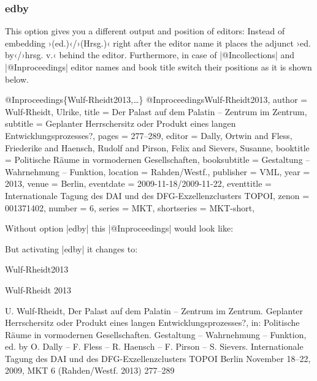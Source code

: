 \documentclass[a4paper,
10pt,
greek,
french,
spanish,
italian,
ngerman,
english
]{ltxdoc}
\begin{document}
\subsubsection{edby}\label{edby}
This option gives you a different output and position of editors: 
Instead of embedding ›(ed.)‹/›(Hrsg.)‹ right after the editor name
 it places the adjunct ›ed. by‹/›hrsg. v.‹ behind the editor. 
 Furthermore, in case of |@Incollections| and |@Inproceedings| editor names and book title switch their positions as it is shown below.

\begin{bibexample}[label=Wulf-Rheidt2013]{{@}Inproceedings\{Wulf-Rheidt2013,…\}}
@Inproceedings{Wulf-Rheidt2013,
  author       = {Wulf-Rheidt, Ulrike},
  title        = {Der Palast auf dem Palatin -- Zentrum im Zentrum},
  subtitle     = {Geplanter Herrschersitz oder Produkt eines langen Entwicklungsprozesses?},
  pages        = {277--289},
  editor       = {Dally, Ortwin and Fless, Friederike and Haensch, Rudolf and Pirson, Felix and Sievers, Susanne},
  booktitle    = {Politische Räume in vormodernen Gesellschaften},
  booksubtitle = {Gestaltung – Wahrnehmung – Funktion},
  location     = {Rahden/Westf\adddot},
  publisher    = VML,    %
  year         = {2013},
  venue        = Berlin,   %
  eventdate    = {2009-11-18/2009-11-22},
  eventtitle   = {Internationale Tagung des DAI und des DFG-Exzellenzclusters TOPOI},
  zenon       = {001371402},
  number       = {6},
  series       = MKT,    %
  shortseries  = MKT-short,  %
}
\end{bibexample}

Without option |edby| this |@Inproceedings| would look like:
 

But activating |edby| it changes to:

\begin{bibbox}{Wulf-Rheidt2013}\footnotesize
\parbox[t]{2.3cm}{Wulf-Rheidt 2013} \parbox[t]{9cm}{%
U. Wulf-Rheidt, Der Palast auf dem Palatin – Zentrum im Zentrum. Geplanter Herrschersitz oder Produkt eines langen Entwicklungsprozesses?, in:  {\color{red}Politische Räume in vormodernen Gesellschaften. Gestaltung – Wahrnehmung – Funktion, ed. by O. Dally – F. Fless – R. Haensch – F. Pirson – S. Sievers}. Internationale Tagung des DAI und des DFG-Exzellenzclusters TOPOI Berlin November 18–22, 2009, MKT 6 (Rahden/Westf. 2013) 277–289}
\end{bibbox}
 
\end{document}
